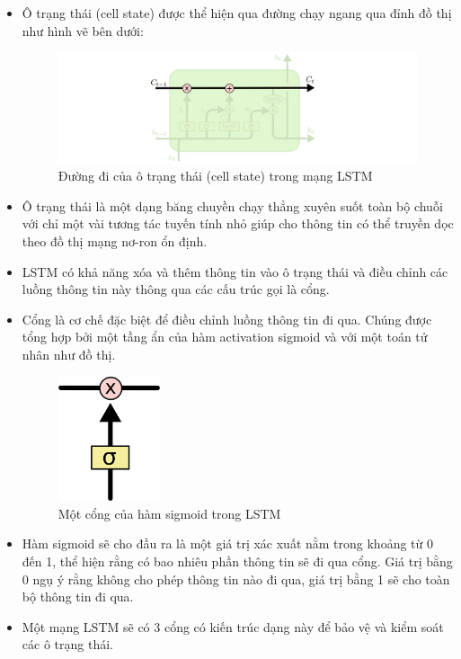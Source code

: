 \begin{itemize}
    \item Ô trạng thái (cell state) được thể hiện qua đường chạy ngang qua đỉnh đồ thị như hình vẽ bên dưới:
    \begin{figure}[H]
        \centering
        \includegraphics[width=14cm]{Images/Architecture/LSTM3-C-line.png}
    \caption{Đường đi của ô trạng thái (cell state) trong mạng LSTM}
    \end{figure}
    \item Ô trạng thái là một dạng băng chuyền chạy thẳng xuyên suốt toàn bộ chuỗi với chỉ một vài tương tác tuyến tính nhỏ giúp cho thông tin có thể truyền dọc theo đồ thị mạng nơ-ron ổn định.
    \item LSTM có khả năng xóa và thêm thông tin vào ô trạng thái và điều chỉnh các luồng thông tin này thông qua các cấu trúc gọi là cổng.
    \item Cổng là cơ chế đặc biệt để điều chỉnh luồng thông tin đi qua. Chúng được tổng hợp bởi một tầng ẩn của hàm activation sigmoid và với một toán tử nhân như đồ thị.
    \begin{figure}[H]
        \centering
        \includegraphics[width=3cm]{Images/Architecture/LSTM3-gate.png}
    \caption{Một cổng của hàm sigmoid trong LSTM}
    \end{figure}
    \item Hàm sigmoid sẽ cho đầu ra là một giá trị xác xuất nằm trong khoảng từ 0 đến 1, thể hiện rằng có bao nhiêu phần thông tin sẽ đi qua cổng. Giá trị bằng 0 ngụ ý rằng không cho phép thông tin nào đi qua, giá trị bằng 1 sẽ cho toàn bộ thông tin đi qua.
    \item Một mạng LSTM sẽ có 3 cổng có kiến trúc dạng này để bảo vệ và kiểm soát các ô trạng thái.
\end{itemize}

